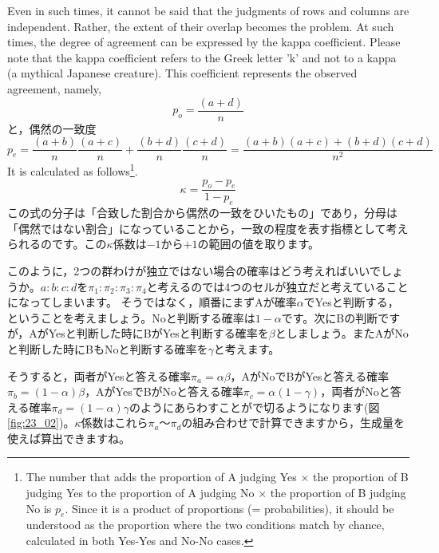 \documentclass{ltjsbook}
\begin{document}


Even in such times, it cannot be said that the judgments of rows and columns are independent. Rather, the extent of their overlap becomes the problem. At such times, the degree of agreement can be expressed by the kappa coefficient. Please note that the kappa coefficient refers to the Greek letter 'k' and not to a kappa (a mythical Japanese creature). This coefficient represents the observed agreement, namely,
\[ p_o = \frac{( a + d )}{n} \]
と，偶然の一致度
\[ p_e = \frac{(a+b)}{n}\frac{(a+c)}{n} + \frac{(b+d)}{n}\frac{(c+d)}{n} = \frac{(a+b)(a+c)+(b+d)(c+d)}{n^2} \]
It is calculated as follows\footnote{The number that adds the proportion of A judging Yes $\times$ the proportion of B judging Yes to the proportion of A judging No $\times$ the proportion of B judging No is $p_e$. Since it is a product of proportions (= probabilities), it should be understood as the proportion where the two conditions match by chance, calculated in both Yes-Yes and No-No cases.}.
\[ \kappa = \frac{p_o-p_e}{1-p_e } \]
この式の分子は「合致した割合から偶然の一致をひいたもの」であり，分母は「偶然ではない割合」になっていることから，一致の程度を表す指標として考えられるのです。この$\kappa$係数は$-1$から$+1$の範囲の値を取ります。


このように，2つの群わけが独立ではない場合の確率はどう考えればいいでしょうか。$a:b:c:d$を$\pi_1:\pi_2:\pi_3:\pi_4$と考えるのでは4つのセルが独立だと考えていることになってしまいます。
そうではなく，順番にまずAが確率$\alpha$でYesと判断する，ということを考えましょう。Noと判断する確率は$1-\alpha$です。次にBの判断ですが，AがYesと判断した時にBがYesと判断する確率を$\beta$としましょう。またAがNoと判断した時にBもNoと判断する確率を$\gamma$と考えます。

そうすると，両者がYesと答える確率$\pi_a = \alpha\beta$，AがNoでBがYesと答える確率$\pi_b = (1-\alpha)\beta$，AがYesでBがNoと答える確率$\pi_c = \alpha(1-\gamma)$，両者がNoと答える確率$\pi_d = (1-\alpha)\gamma $のようにあらわすことがで切るようになります(図\ref{fig:23_02})。$\kappa$係数はこれら$\pi_a$〜$\pi_d$の組み合わせで計算できますから，生成量を使えば算出できますね。
\end{document}
